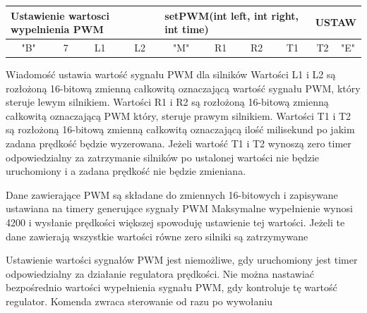 \documentclass[eng,printmode]{mgr}
\begin{document}
\begin{table}[!htb]
\centering
\begin{adjustbox}{width=1\textwidth}
\label{my-label}
\begin{tabular}{|c|c|c|c|c|c|c|c|c|c|}
\hline
\multicolumn{4}{|l|}{Ustawienie wartosci wypelnienia PWM } & \multicolumn{4}{l|}{setPWM(int left, int right, int time)} & \multicolumn{2}{l|}{USTAW} \\ \hline
"B" \hspace{1em}             & 7\hspace{2em}              & L1\hspace{2em}              & L2\hspace{2em}         & "M"\hspace{2em}         & R1\hspace{2em}         & R2\hspace{2em}         & T1\hspace{2em}         & T2\hspace{2em}          & "E"\hspace{2em}          \\ \hline
\end{tabular}
\end{adjustbox}
\end{table}

Wiadomość ustawia wartość sygnału PWM dla silników 
Wartości L1 i L2 są rozłożoną 16-bitową zmienną całkowitą oznaczającą wartość sygnału PWM, który steruje lewym silnikiem.
Wartości R1 i R2 są rozłożoną 16-bitową zmienną całkowitą oznaczającą PWM który, steruje prawym silnikiem.
Wartości T1 i T2 są rozłożoną 16-bitową zmienną całkowitą oznaczającą ilość milisekund po jakim zadana prędkość będzie wyzerowana. Jeżeli wartość T1 i T2 wynoszą zero timer odpowiedzialny za zatrzymanie silników po ustalonej wartości nie będzie uruchomiony i a zadana prędkość nie będzie zmieniana.

Dane zawierające PWM są składane do zmiennych 16-bitowych i zapisywane ustawiana na timery generujące sygnały PWM Maksymalne wypełnienie wynosi 4200 i wysłanie prędkości większej spowoduję ustawienie tej wartości. Jeżeli te dane zawierają wszystkie wartości równe zero silniki są zatrzymywane

Ustawienie wartości sygnałów PWM jest niemożliwe, gdy uruchomiony jest timer odpowiedzialny za działanie regulatora prędkości. Nie można nastawiać bezpośrednio wartości wypełnienia sygnału PWM, gdy kontroluje tę wartość regulator.
Komenda zwraca sterowanie od razu po wywołaniu
\end{document}
